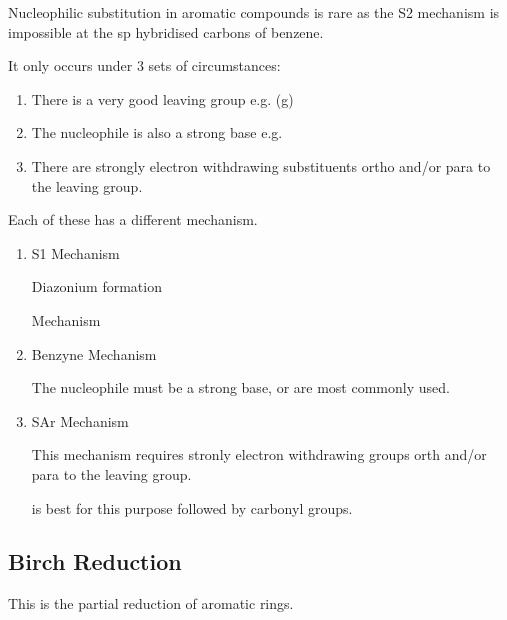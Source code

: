 Nucleophilic substitution in aromatic compounds is rare as the S2 mechanism is impossible at the sp hybridised carbons of benzene.


It only occurs under 3 sets of circumstances:
\begin{enumerate}
  \item There is a very good leaving group e.g.  (g)
  \item The nucleophile is also a strong base e.g. 
  \item There are strongly electron withdrawing substituents ortho and/or para to the leaving group.
\end{enumerate}

Each of these has a different mechanism.

\begin{enumerate}[label=\alph*)]
  \item S1 Mechanism


    Diazonium formation


    Mechanism


  \item Benzyne Mechanism


    The nucleophile must be a strong base,  or  are most commonly used.

  \item SAr Mechanism


    This mechanism requires stronly electron withdrawing groups orth and/or para to the leaving group.

     is best for this purpose followed by carbonyl groups.


\end{enumerate}

\subsection{Birch Reduction}

This is the partial reduction of aromatic rings.

